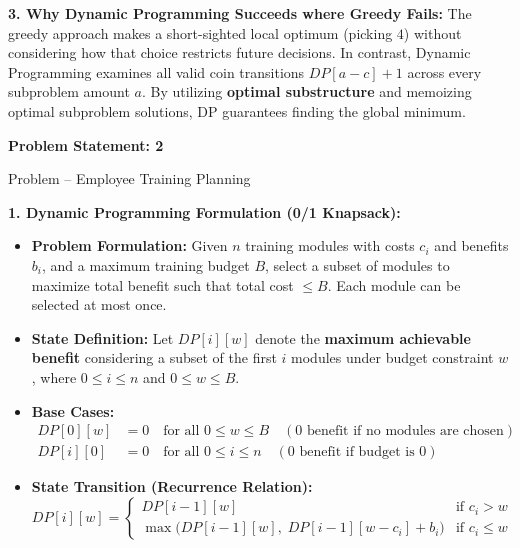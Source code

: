\documentclass[12pt]{article}
\begin{document}
\textbf{3. Why Dynamic Programming Succeeds where Greedy Fails:}
The greedy approach makes a short-sighted local optimum (picking $4$) without considering how that choice restricts future decisions. In contrast, Dynamic Programming examines all valid coin transitions $DP[a - c] + 1$ across every subproblem amount $a$. By utilizing \textbf{optimal substructure} and memoizing optimal subproblem solutions, DP guarantees finding the global minimum.

\newpage


\textbf{Problem Statement: 2}

Problem -- Employee Training Planning

\vspace{0.2cm}

\textbf{1. Dynamic Programming Formulation (0/1 Knapsack):}
\begin{itemize}
    \item \textbf{Problem Formulation:} Given $n$ training modules with costs $c_i$ and benefits $b_i$, and a maximum training budget $B$, select a subset of modules to maximize total benefit such that total cost $\le B$. Each module can be selected at most once.
    \item \textbf{State Definition:} Let $DP[i][w]$ denote the \textbf{maximum achievable benefit} considering a subset of the first $i$ modules under budget constraint $w$, where $0 \le i \le n$ and $0 \le w \le B$.
    \item \textbf{Base Cases:}
    \begin{align*}
        DP[0][w] &= 0 \quad \text{for all } 0 \le w \le B \quad (\text{0 benefit if no modules are chosen}) \\
        DP[i][0] &= 0 \quad \text{for all } 0 \le i \le n \quad (\text{0 benefit if budget is 0})
    \end{align*}
    \item \textbf{State Transition (Recurrence Relation):}
    \begin{equation*}
        DP[i][w] = \begin{cases}
            DP[i-1][w] & \text{if } c_i > w \\
            \max\Big(DP[i-1][w], \; DP[i-1][w - c_i] + b_i\Big) & \text{if } c_i \le w
        \end{cases}
    \end{equation*}
\end{itemize}
\end{document}
